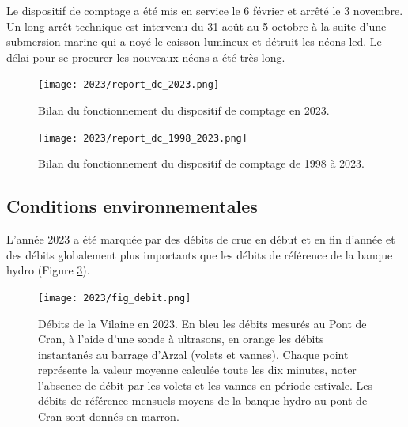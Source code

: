 \documentclass[11pt,twocolumn,titlepage,twoside]{article}\usepackage[]{graphicx}\usepackage[]{color}
\begin{document}
Le dispositif de comptage a été mis en service le 6 février et arrêté le 3 novembre. 
Un long arrêt technique est intervenu du 31 août au 5 octobre à la suite 
d'une submersion marine qui a noyé le caisson lumineux et détruit les néons led.
Le délai pour se procurer les nouveaux néons a été très long.

\begin{figure}[htpb]
\centering
\texttt{[image: 2023/report\_dc\_2023.png]} 
\caption{Bilan du fonctionnement du dispositif de comptage en 2023.}
\label{report_dc_2023}
\end{figure}

\begin{figure}[htpb]
\centering
\texttt{[image: 2023/report\_dc\_1998\_2023.png]} 
\caption{Bilan du fonctionnement du dispositif de comptage de 1998 à 2023.}
\label{report_dc_1998_2023}
\end{figure}
























\subsection{Conditions environnementales}

L'année 2023 a été marquée par des débits de crue en début et en
fin d'année et des débits globalement plus importants que les débits de
référence de la banque hydro (Figure \ref{fig_debit}).
\begin{figure}[htpb]
\centering
\texttt{[image: 2023/fig\_debit.png]} 
\caption{Débits de la Vilaine en 2023. En bleu les débits mesurés au Pont
de Cran, à l'aide d'une sonde à ultrasons, en orange les débits instantanés au
barrage d'Arzal (volets et vannes). Chaque point représente la valeur moyenne calculée toute les
dix minutes, noter l'absence de débit par les volets et les vannes en période
estivale. Les débits de référence mensuels moyens de la banque hydro au pont de
Cran sont donnés en marron.}
\label{fig_debit}
\end{figure}
\end{document}
